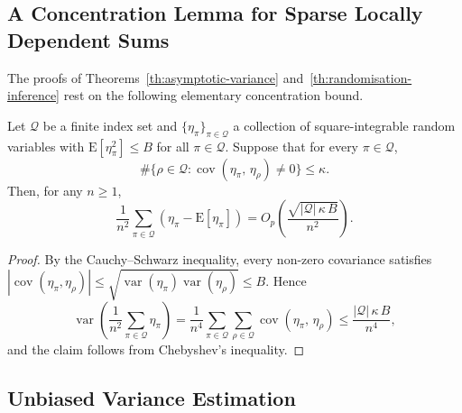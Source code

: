 \documentclass[sigconf,nonacm]{acmart}
\newcommand{\E}{\mathrm E}
\DeclareMathOperator{\var}{var}
\DeclareMathOperator{\cov}{cov}
\begin{document}
\subsection{A Concentration Lemma for Sparse Locally Dependent Sums}

The proofs of Theorems~\ref{th:asymptotic-variance} and~\ref{th:randomisation-inference} rest on the following elementary concentration bound.

\begin{lemma}\label{lem:sparse}
    Let $\mathcal Q$ be a finite index set and $\{\eta_\pi\}_{\pi\in\mathcal Q}$ a collection of square-integrable random variables with $\E[\eta_\pi^2]\le B$ for all $\pi\in\mathcal Q$. Suppose that for every $\pi\in\mathcal Q$,
    \begin{equation*}
        \#\{\rho\in\mathcal Q\colon \cov(\eta_\pi,\,\eta_\rho)\neq 0\} \le \kappa.
    \end{equation*}
    Then, for any $n\ge 1$,
    \begin{equation*}
        \frac 1{n^2}\sum_{\pi\in\mathcal Q}(\eta_\pi - \E[\eta_\pi]) = O_p\left(\frac{\sqrt{|\mathcal Q|\,\kappa\, B}}{n^2}\right).
    \end{equation*}
\end{lemma}
\begin{proof}
    By the Cauchy--Schwarz inequality, every non-zero covariance satisfies $|{\cov(\eta_\pi,\eta_\rho)}|\le \sqrt{\var(\eta_\pi)\var(\eta_\rho)}\le B$. Hence
    \begin{equation*}
        \var\left(\frac 1{n^2}\sum_{\pi\in\mathcal Q}\eta_\pi\right) = \frac 1{n^4}\sum_{\pi\in\mathcal Q}\sum_{\rho\in\mathcal Q}\cov(\eta_\pi,\,\eta_\rho) \le \frac{|\mathcal Q|\,\kappa\,B}{n^4},
    \end{equation*}
    and the claim follows from Chebyshev's inequality.
\end{proof}

\subsection{Unbiased Variance Estimation}\label{app:variance}
\end{document}
